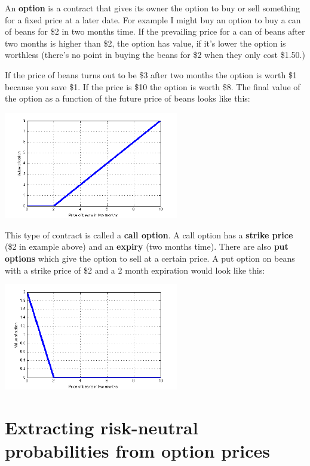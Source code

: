 An \textbf{option} is a contract that gives its owner the option to buy or sell something for a fixed price at a later date. For example I might buy an option to buy a can of beans for \$2 in two months time. If the prevailing price for a can of beans after two months is higher than \$2, the option has value, if it's lower the option is worthless (there's no point in buying the beans for \$2 when they only cost \$1.50.)

If the price of beans turns out to be \$3 after two months the option is worth \$1 because you save \$1. If the price is \$10 the option is worth \$8. The final value of the option as a function of the future price of beans looks like this:

\begin{center}
  \includegraphics[width=3in]{pics/beanscall.png} 
\end{center}

This type of contract is called a \textbf{call option}. A call option has a \textbf{strike price} (\$2 in example above) and an \textbf{expiry} (two months time). There are also \textbf{put options} which give the option to sell at a certain price. A put option on beans with a strike price of \$2 and a 2 month expiration would look like this:

\begin{center}
  \includegraphics[width=3in]{pics/beansput.png} 
\end{center}


\section{Extracting risk-neutral probabilities from option prices}

